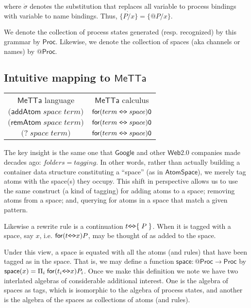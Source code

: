 where $\dot{\sigma}$ denotes the substitution that replaces all variable to process bindings with variable to name bindings. Thus, $\dot{\{P / x\}} = \{\mathsf{@}P / x\}$.

We denote the collection of process states generated
(resp. recognized) by this grammar by $\mathsf{Proc}$. Likewise, we
denote the collection of spaces (aka channels or names) by
$\mathsf{@}\mathsf{Proc}$.

\subsection{Intuitive mapping to $\mathsf{MeTTa}$}

\begin{center}
\begin{tabular}{ c c }
  $\mathsf{MeTTa}$ language & $\mathsf{MeTTa}$ calculus \\ 
  $\mathsf{(}\mathsf{addAtom}\; space \; term \mathsf{)}$ & $\mathsf{for}( term \;\texttt{<\!-\!>}\; space )\mathsf{0}$ \\
  $\mathsf{(}\mathsf{remAtom}\; space \; term \mathsf{)}$ & $\mathsf{for}( term \;\texttt{<\!-\!>}\; space )\mathsf{0}$ \\
  $\mathsf{(}\mathsf{?}\; space\; term \mathsf{)}$ & $\mathsf{for}( term \;\texttt{<\!-\!>}\; space )\mathsf{0}$ \\  
\end{tabular}
\end{center}

The key insight is the same one that $\mathsf{Google}$ and other
$\mathsf{Web 2.0}$ companies made decades ago: $folders = tagging$. In
other words, rather than actually building a container data structure
constituting a ``space'' (as in $\mathsf{AtomSpace}$), we merely tag
atoms with the space(s) they occupy. This shift in perspective allows
us to use the same construct (a kind of tagging) for adding atoms to a
space; removing atoms from a space; and, querying for atoms in a space
that match a given pattern.

Likewise a rewrite rule is a continuation $t \texttt{<\!-\!>} \mathsf{\{} \;P\;\mathsf{\}}$. When it is tagged with a space, say $x$, i.e. $\mathsf{for}( t \texttt{<\!-\!>} x )P$, may be thought of as added to the space.

Under this view, a space is equated with all the atoms (and rules)
that have been tagged as in the space. That is, we may define a
function $\mathsf{space}:\mathsf{@}\mathsf{Proc} \rightarrow \mathsf{Proc}$ by $\mathsf{space}(x) = \Pi_{i}\;\mathsf{for}( t_{i} \texttt{<\!-\!>} x )P_{i}$. Once we make this definition we note  we have two interlated algebras of considerable additional interest. One is the algebra of spaces as tags, which is isomorphic to the algebra of process states, and another is the algebra of the spaces as collections of atoms (and rules).


